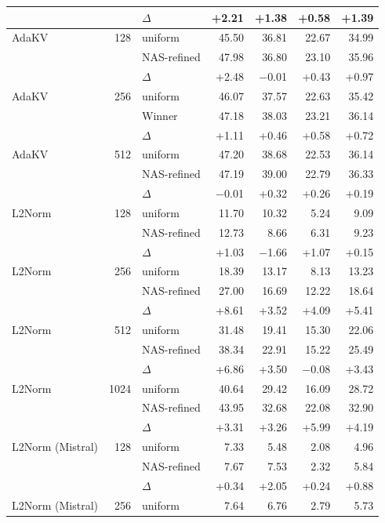 \begin{table}[tp]
\begin{tabular}{@{}l r l r r r r @{}}
     &  & $\Delta$ & +2.21 & +1.38 & +0.58 & +1.39 \\
    \midrule
    AdaKV & 128 & uniform & 45.50 & 36.81 & 22.67 & 34.99 \\
     &  & NAS-refined & 47.98 & 36.80 & 23.10 & 35.96 \\
     &  & $\Delta$ & +2.48 & $-$0.01 & +0.43 & +0.97 \\
    \midrule
    AdaKV & 256 & uniform & 46.07 & 37.57 & 22.63 & 35.42 \\
     &  & Winner & 47.18 & 38.03 & 23.21 & 36.14 \\
     &  & $\Delta$ & +1.11 & +0.46 & +0.58 & +0.72 \\
    \midrule
    AdaKV & 512 & uniform & 47.20 & 38.68 & 22.53 & 36.14 \\
     &  & NAS-refined & 47.19 & 39.00 & 22.79 & 36.33 \\
     &  & $\Delta$ & $-$0.01 & +0.32 & +0.26 & +0.19 \\
    \midrule
    L2Norm & 128 & uniform & 11.70 & 10.32 & 5.24 & 9.09 \\
     &  & NAS-refined & 12.73 & 8.66 & 6.31 & 9.23 \\
     &  & $\Delta$ & +1.03 & $-$1.66 & +1.07 & +0.15 \\
    \midrule
    L2Norm & 256 & uniform & 18.39 & 13.17 & 8.13 & 13.23 \\
     &  & NAS-refined & 27.00 & 16.69 & 12.22 & 18.64 \\
     &  & $\Delta$ & +8.61 & +3.52 & +4.09 & +5.41 \\
    \midrule
    L2Norm & 512 & uniform & 31.48 & 19.41 & 15.30 & 22.06 \\
     &  & NAS-refined & 38.34 & 22.91 & 15.22 & 25.49 \\
     &  & $\Delta$ & +6.86 & +3.50 & $-$0.08 & +3.43 \\
    \midrule
    L2Norm & 1024 & uniform & 40.64 & 29.42 & 16.09 & 28.72 \\
     &  & NAS-refined & 43.95 & 32.68 & 22.08 & 32.90 \\
     &  & $\Delta$ & +3.31 & +3.26 & +5.99 & +4.19 \\
    \midrule
    L2Norm (Mistral) & 128 & uniform & 7.33 & 5.48 & 2.08 & 4.96 \\
     &  & NAS-refined & 7.67 & 7.53 & 2.32 & 5.84 \\
     &  & $\Delta$ & +0.34 & +2.05 & +0.24 & +0.88 \\
    \midrule
    L2Norm (Mistral) & 256 & uniform & 7.64 & 6.76 & 2.79 & 5.73 \\

\end{tabular}
\end{table}
